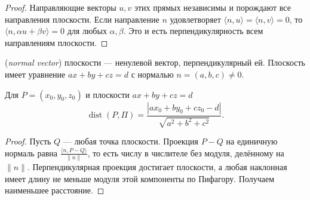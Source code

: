 \begin{proof}Направляющие векторы \(u,v\) этих прямых независимы и порождают все направления плоскости. Если направление \(n\) удовлетворяет \(\langle n,u\rangle=\langle n,v\rangle=0\), то \(\langle n,\alpha u+\beta v\rangle=0\) для любых \(\alpha,\beta\). Это и есть перпендикулярность всем направлениям плоскости.\end{proof}
\begin{definition} (\emph{normal vector}) плоскости — ненулевой вектор, перпендикулярный ей. Плоскость имеет уравнение \(ax+by+cz=d\) с нормалью \(n=(a,b,c)\ne0\).\end{definition}
\begin{theorem}
Для \(P=(x_0,y_0,z_0)\) и плоскости \(ax+by+cz=d\)
\[
\operatorname{dist}(P,\Pi)=
\frac{|ax_0+by_0+cz_0-d|}{\sqrt{a^2+b^2+c^2}}.
\]
\end{theorem}
\begin{proof}Пусть \(Q\) — любая точка плоскости. Проекция \(P-Q\) на единичную нормаль равна \(\frac{\langle n,P-Q\rangle}{\|n\|}\), то есть числу в числителе без модуля, делённому на \(\|n\|\). Перпендикулярная проекция достигает плоскости, а любая наклонная имеет длину не меньше модуля этой компоненты по Пифагору. Получаем наименьшее расстояние.\end{proof}
